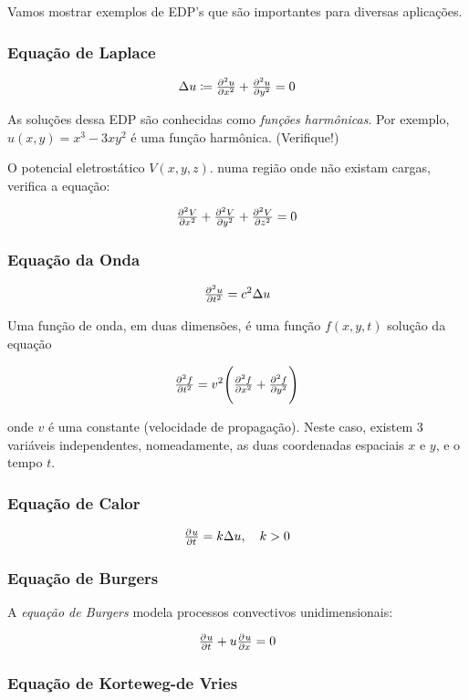 \documentclass[11pt,twoside,a4paper]{book}
\begin{document}
Vamos mostrar exemplos de EDP's que são importantes para diversas aplicações.

\subsubsection{Equação de Laplace}

\[\Delta u \coloneqq \pd[2]{u}{x} + \pd[2]{u}{y} = 0\]

\noindent
As soluções dessa EDP são conhecidas como \emph{funções harmônicas}. Por exemplo, $u(x,y) = x^3 - 3 xy^2$ é uma função harmônica. (Verifique!)

\noindent
O potencial eletrostático $V(x,y,z).$ numa região onde não existam cargas, verifica a equação:


\[
    \pd[2]{V}{x} + \pd[2]{V}{y} + \pd[2]{V}{z} = 0
\]

\subsubsection{Equação da Onda}

\[
\pd[2]{u}{t} = c^2 \Delta u
\]

\noindent
Uma função de onda, em duas dimensões, é uma função $f(x,y,t)$ solução da equação

\[\pd[2]{f}{t} =  v^2 \Bigg(\pd[2]{f}{x} + \pd[2]{f}{y}\Bigg)
\]

\noindent
onde $v$ é uma constante (velocidade de propagação). Neste caso, existem $3$ variáveis independentes, nomeadamente, as duas coordenadas espaciais $x$ e $y$, e o tempo $t.$

\subsubsection{Equação de Calor}

\[
\pd{u}{t} = k \Delta u, \quad k > 0
\]

\subsubsection{Equação de Burgers}

A \emph{equação de Burgers} modela processos convectivos unidimensionais:

\[
\pd{u}{t} + u \pd{u}{x} = 0
\]

\subsubsection{Equação de Korteweg-de Vries}
\end{document}
